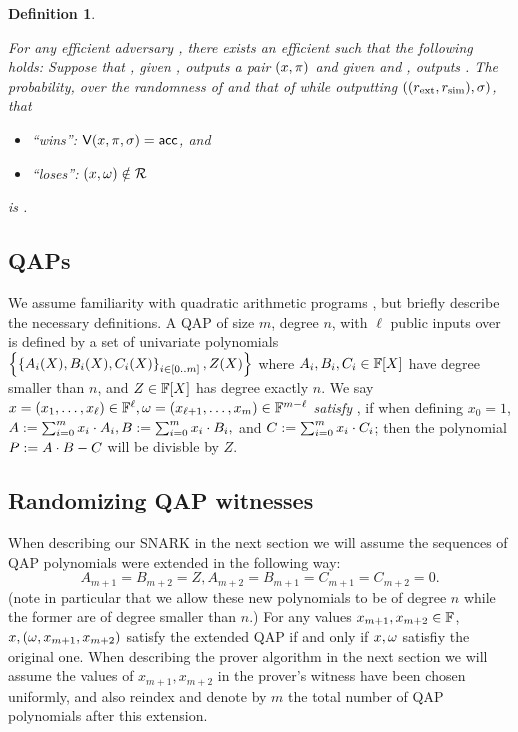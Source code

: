 \documentclass[11pt]{article}
\numberwithin{figure}{section} %
\newtheorem{dfn}[thm]{Definition}
\newcommand{\set}[1]{\ensuremath{\left\{#1\right\}}\xspace}
\begin{document}
\begin{dfn}
\begin{enumerate}
For any efficient adversary \adv, there exists an efficient  \ext such that the following holds:
Suppose that \adv, given \crs,
outputs a pair $(x,\pi)$ and \ext given \advrand and \trapdoorext,
outputs \wit.
The probability, over the randomness of \adv and that of \gen while outputting $((r_{\mathrm{ext}},r_{\mathrm{sim}}),\sigma)$,
 that 
\begin{itemize}
 \item \adv ``wins'': $\mathsf{V}(x,\pi,\sigma)=\mathsf{acc}$, and
 \item \ext ``loses'': $(x,\omega)\notin \mathcal{R}$
\end{itemize}
is \negl.
 \end{enumerate}
 
 \end{dfn}
\subsection{QAPs} 
We assume familiarity with quadratic arithmetic programs \cite{GGPR}, but briefly describe the necessary definitions.
A QAP \qap of size $m$, degree $n$, with $\ell$ public inputs over \F
is defined by a set of univariate polynomials \set{\sett{A_i(X),B_i(X),C_i(X)}{i\in [0..m]}, Z(X)}
where $A_i,B_i,C_i\in \mathbb F[X]$ have degree smaller than $n$, and $Z\in \mathbb F[X]$ has degree exactly $n$.
We say $x=(x_1,\ldots,x_\ell)\in \mathbb F^\ell,\omega=(x_{\ell+1},\ldots,x_m) \in \mathbb F^{m-\ell}$ \emph{satisfy \qap}, if when defining $x_0=1$,
$A:= \sum_{i=0}^m x_i\cdot A_i, B:= \sum_{i=0}^m x_i \cdot B_i,$ and $C:= \sum_{i=0}^m x_i \cdot C_i$;
then the polynomial $P:= A\cdot B - C$ will be divisble by $Z$.

\subsection{Randomizing QAP witnesses}
When describing our SNARK in the next section we will assume the sequences of QAP polynomials were extended in the following way:
\[A_{m+1}=B_{m+2}=Z, A_{m+2}=B_{m+1}=C_{m+1}=C_{m+2} =0.\]
(note in particular that we allow these new polynomials to be of degree $n$ while the former are of degree smaller than $n$.)
For any values $x_{m+1},x_{m+2}\in\mathbb F$, $x,(\omega,x_{m+1},x_{m+2})$ satisfy the extended QAP if and only if $x,\omega$ satisfiy the original one.
When describing the prover algorithm in the next section we will assume the values of $x_{m+1},x_{m+2}$ in the prover's witness \wit have been chosen uniformly, and also reindex and denote by $m$ the total number of QAP polynomials after this extension.
\end{document}

